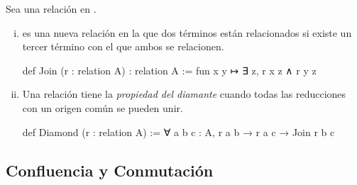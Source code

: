 \begin{defn}
Sea  una relación en .
\begin{enumerate}[(i)]
\item {} es una nueva relación en la que 
dos términos están relacionados 
si existe un tercer término con el que ambos se relacionen.

\begin{leancode}
def Join (r : relation A) : relation A := fun x y ↦ ∃ z, r x z ∧ r y z
\end{leancode}

\item Una relación tiene la \textit{propiedad del diamante}
cuando todas las reducciones con un origen común se pueden unir.

\begin{center}
\end{center}

\begin{leancode}
def Diamond (r : relation A) := ∀ {a b c : A}, r a b → r a c → Join r b c
\end{leancode}
\end{enumerate}
\end{defn}

\subsection{Confluencia y Conmutación}

